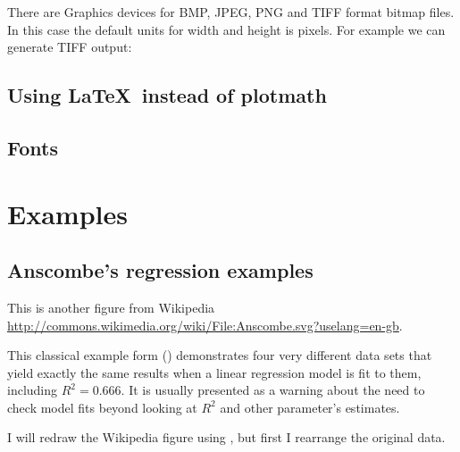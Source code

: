 \documentclass[paper=a4,10pt,div=17,headsepline,BCOR=12mm,twoside,open=right]{scrbook}\usepackage{knitr}
\begin{document}
There are Graphics devices for BMP, JPEG, PNG and TIFF format bitmap files. In this case the default units for width and height is pixels. For example we can generate TIFF output:

\begin{knitrout}\footnotesize
{}\color{fgcolor}\begin{kframe}
\begin{alltt}
\hlstd{(}\hlstd{=}\hlstd{,} \hlstd{=}\hlstd{,} \hlstd{=}\hlstd{)}
\hlstd{()}
\end{alltt}
\end{kframe}
\end{knitrout}

\subsection{Using \LaTeX\ instead of plotmath}

\subsection{Fonts}

\section{Examples}

\subsection{Anscombe's regression examples}

This is another figure from Wikipedia \url{http://commons.wikimedia.org/wiki/File:Anscombe.svg?uselang=en-gb}.

This classical example form \citeauthor{Anscombe1973} (\citeyear{Anscombe1973}) demonstrates four very different data sets that yield exactly the same results when a linear regression model is fit to them, including $R^2 = 0.666$. It is usually presented as a warning about the need to check model fits beyond looking at $R^2$ and other parameter's estimates.

I will redraw the Wikipedia figure using \ggplot, but first I rearrange the original data.
\end{document}
